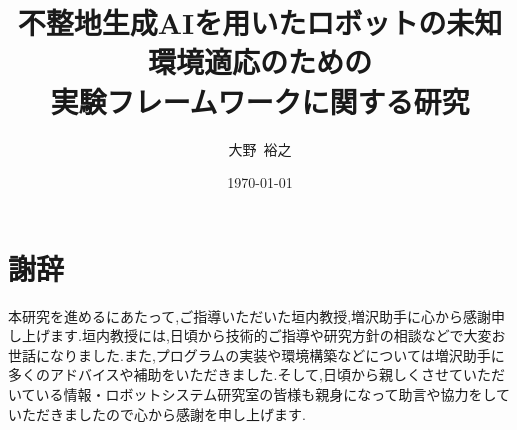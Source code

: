 \documentclass[10pt,a4j]{jarticle}
\title{不整地生成AIを用いたロボットの未知環境適応のための\\実験フレームワークに関する研究} %
\date{\today} %
\author{大野\ 裕之} %
\begin{document}
\maketitle
\thispagestyle{empty}
\setcounter{page}{0}
\newpage


\newpage

\tableofcontents
\newpage

% 




\newpage

\section*{謝辞}
本研究を進めるにあたって,ご指導いただいた垣内教授,増沢助手に心から感謝申し上げます.垣内教授には,日頃から技術的ご指導や研究方針の相談などで大変お世話になりました.また,プログラムの実装や環境構築などについては増沢助手に多くのアドバイスや補助をいただきました.そして,日頃から親しくさせていただいている情報・ロボットシステム研究室の皆様も親身になって助言や協力をしていただきましたので心から感謝を申し上げます.

\newpage

\end{document}
